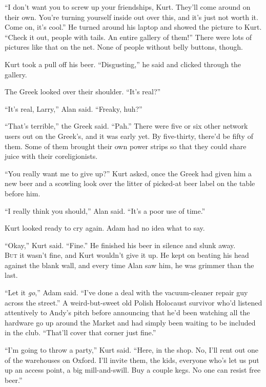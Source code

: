 ``I don't want you to screw up your friendships, Kurt.  They'll come
around on their own.  You're turning yourself inside out over this,
and it's just not worth it.  Come on, it's cool.'' He turned around
his laptop and showed the picture to Kurt.  ``Check it out, people
with tails.  An entire gallery of them!'' There were lots of pictures
like that on the net.  None of people without belly buttons, though.

Kurt took a pull off his beer.  ``Disgusting,'' he said and clicked
through the gallery.

The Greek looked over their shoulder.  ``It's real?''

``It's real, Larry,'' Alan said.  ``Freaky, huh?''

``That's terrible,'' the Greek said.  ``Pah.'' There were five or six
other network users out on the Greek's, and it was early yet.  By
five-thirty, there'd be fifty of them.  Some of them brought their own
power strips so that they could share juice with their coreligionists.

``You really want me to give up?'' Kurt asked, once the Greek had
given him a new beer and a scowling look over the litter of picked-at
beer label on the table before him.

``I really think you should,'' Alan said.  ``It's a poor use of
time.''

Kurt looked ready to cry again.  Adam had no idea what to say.

``Okay,'' Kurt said.  ``Fine.'' He finished his beer in silence and
slunk away.
\\
\lettrine[lines=3, lhang=.5, nindent=0pt, findent=2pt]{B}{ut} it wasn't fine, and Kurt wouldn't give it up.  He kept on beating
his head against the blank wall, and every time Alan saw him, he was
grimmer than the last.

``Let it \textit{go},'' Adam said.  ``I've done a deal with the
vacuum-cleaner repair guy across the street.'' A weird-but-sweet old
Polish Holocaust survivor who'd listened attentively to Andy's pitch
before announcing that he'd been watching all the hardware go up
around the Market and had simply been waiting to be included in the
club.  ``That'll cover that corner just fine.''

``I'm going to throw a party,'' Kurt said.  ``Here, in the shop.  No,
I'll rent out one of the warehouses on Oxford.  I'll invite them, the
kids, everyone who's let us put up an access point, a big
mill-and-swill.  Buy a couple kegs.  No one can resist free beer.''

